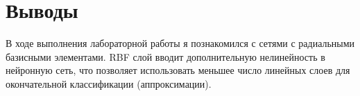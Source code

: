 \section{Выводы}
В ходе выполнения лабораторной работы я познакомился с сетями с радиальными базисными элементами. RBF слой вводит дополнительную нелинейность в нейронную сеть, что позволяет использовать меньшее число линейных слоев для окончательной классификации (аппроксимации).
\pagebreak
